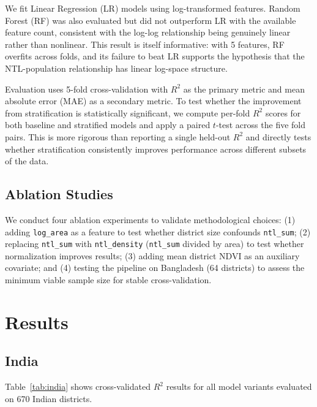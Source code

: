 \documentclass[conference]{IEEEtran}
\begin{document}
We fit Linear Regression (LR) models using log-transformed features. Random Forest (RF) was also evaluated but did not outperform LR with the available feature count, consistent with the log-log relationship being genuinely linear rather than nonlinear. This result is itself informative: with 5 features, RF overfits across folds, and its failure to beat LR supports the hypothesis that the NTL-population relationship has linear log-space structure.

Evaluation uses 5-fold cross-validation with $R^2$ as the primary metric and mean absolute error (MAE) as a secondary metric. To test whether the improvement from stratification is statistically significant, we compute per-fold $R^2$ scores for both baseline and stratified models and apply a paired $t$-test across the five fold pairs. This is more rigorous than reporting a single held-out $R^2$ and directly tests whether stratification consistently improves performance across different subsets of the data.

\subsection{Ablation Studies}

We conduct four ablation experiments to validate methodological choices: (1) adding \texttt{log\_area} as a feature to test whether district size confounds \texttt{ntl\_sum}; (2) replacing \texttt{ntl\_sum} with \texttt{ntl\_density} (\texttt{ntl\_sum} divided by area) to test whether normalization improves results; (3) adding mean district NDVI as an auxiliary covariate; and (4) testing the pipeline on Bangladesh (64 districts) to assess the minimum viable sample size for stable cross-validation.

\section{Results}

\subsection{India}

Table~\ref{tab:india} shows cross-validated $R^2$ results for all model variants evaluated on 670 Indian districts.
\end{document}
